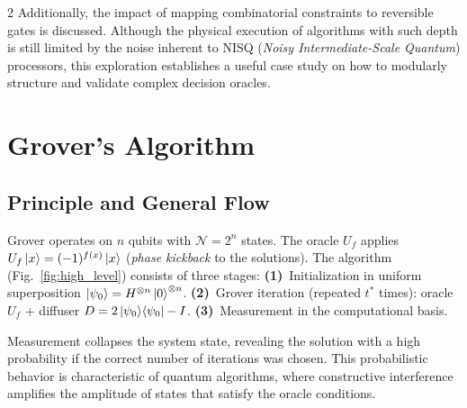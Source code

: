 \documentclass[9pt, a4paper]{extarticle}
\begin{document}
\begin{multicols}{2}
Additionally, the impact of mapping combinatorial constraints to reversible gates is discussed. Although the physical execution of algorithms with such depth is still limited by the noise inherent to NISQ (\emph{Noisy Intermediate-Scale Quantum}) processors, this exploration establishes a useful case study on how to modularly structure and validate complex decision oracles.

\section{Grover's Algorithm}

\subsection{Principle and General Flow}

Grover operates on $n$ qubits with $\mathcal{N} = 2^n$ states. The oracle $U_f$ applies $U_f\ket{x} = (-1)^{f(x)}\ket{x}$ (\emph{phase kickback} to the solutions). The algorithm (Fig.~\ref{fig:high_level}) consists of three stages:
\textbf{(1)}~Initialization in uniform superposition $\ket{\psi_0} = H^{\otimes n}\ket{0}^{\otimes n}$.
\textbf{(2)}~Grover iteration (repeated $t^*$ times): oracle $U_f$ + diffuser $D = 2\ket{\psi_0}\!\bra{\psi_0} - I$.
\textbf{(3)}~Measurement in the computational basis.

Measurement collapses the system state, revealing the solution with a high probability if the correct number of iterations was chosen. This probabilistic behavior is characteristic of quantum algorithms, where constructive interference amplifies the amplitude of states that satisfy the oracle conditions.

\begin{figure}[H]
    \centering
\end{figure}
\end{multicols}
\end{document}
